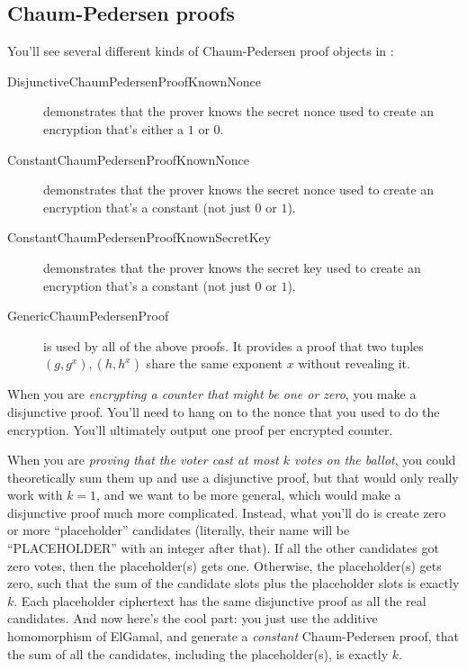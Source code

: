 \subsection{Chaum-Pedersen proofs}
\label{sec:chaum-pedersen}
You'll see several different kinds of Chaum-Pedersen proof objects
in :
\begin{description}
\item[DisjunctiveChaumPedersenProofKnownNonce] demonstrates that the prover knows
  the secret nonce used to create an encryption that's either a $1$ or $0$.
\item[ConstantChaumPedersenProofKnownNonce] demonstrates that the prover
  knows the secret nonce used to create an encryption that's a
  constant (not just $0$ or $1$).
\item[ConstantChaumPedersenProofKnownSecretKey] demonstrates that the prover
  knows the secret key used to create an encryption that's a
  constant (not just $0$ or $1$).
\item[GenericChaumPedersenProof]
  is used by all of the above proofs. It provides a proof that two
  tuples $(g, g^x), (h, h^x)$ share the same exponent $x$ without
  revealing it.
\end{description}

When you are {\em encrypting a counter that might be one or zero}, you
make a disjunctive proof. You'll need to hang on to the nonce that you
used to do the encryption. You'll ultimately output one proof per encrypted
counter.

When you are {\em proving that the voter cast at most $k$ votes on the ballot},
you could theoretically sum them up and use a disjunctive proof, but
that would only really work with $k=1$, and we want to be more
general, which would make a disjunctive proof
much more complicated. Instead, what you'll do is create zero or more
``placeholder'' candidates (literally, their name will be
``PLACEHOLDER'' with an integer after that). If all the other candidates got zero votes, then the
placeholder(s) gets one. Otherwise, the placeholder(s) gets zero, such
that the sum of the candidate slots plus the placeholder slots is
exactly $k$. Each
placeholder ciphertext has the same disjunctive proof as all the real candidates.
And now here's the cool part: you just use the additive homomorphism
of ElGamal, and generate a {\em constant} Chaum-Pedersen proof, that
the sum of all the candidates, including the placeholder(s), is exactly
$k$.

